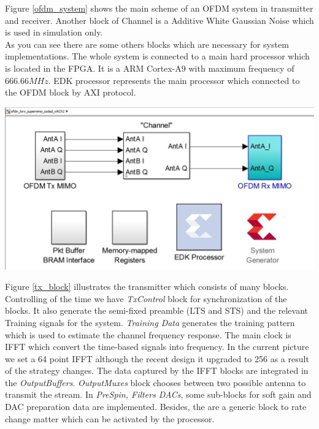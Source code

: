 Figure \ref{ofdm_system} shows the main scheme of an OFDM system in transmitter and receiver. Another block of Channel is a Additive White Gaussian Noise which is used in simulation only.\\
As you can see there are some others blocks which are necessary for system implementations. The whole system is connected to a main hard processor which is located in the FPGA. It is a ARM Cortex-A9 with maximum frequency of $666.66 MHz$. EDK processor represents the main processor which connected to the OFDM block by AXI protocol. 

\begin{center}
\includegraphics[width=\textwidth]{content/fig/system.JPG}
\label{ofdm_system}
\end{center}

Figure \ref{tx_block} illustrates the transmitter which consists of many blocks. Controlling of the time we have \textit{TxControl} block for synchronization of the blocks. It also generate the semi-fixed preamble (LTS and STS) and the relevant Training signals for the system. \textit{Training Data} generates the training pattern which is used to estimate the channel frequency response.
The main clock is IFFT which convert the time-based signals into frequency. In the current picture we set a 64 point IFFT although the recent design it upgraded to 256 as a result of the strategy changes. The data captured by the IFFT blocks are integrated in the \textit{OutputBuffers}. \textit{OutputMuxes} block chooses between two possible antenna to transmit the stream. In \textit{PreSpin, Filters DACs}, some sub-blocks for soft gain and DAC preparation data are implemented. Besides, the are a generic block to rate change matter which can be activated by the processor.\\

